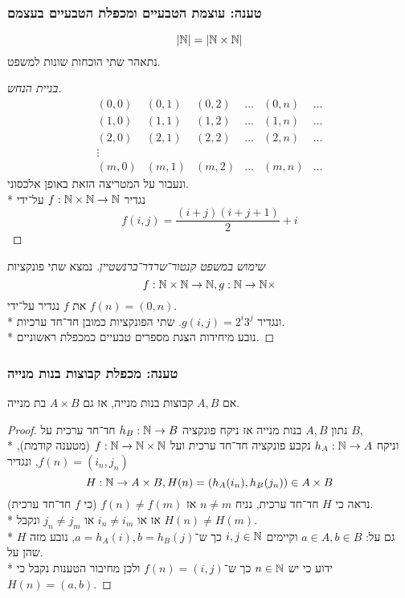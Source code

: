 \subsubsection{טענה: עוצמת הטבעיים ומכפלת הטבעיים בעצמם}
\[
	|\mathbb{N}| = |\mathbb{N} \times \mathbb{N}|
\]
נתאהר שתי הוכחות שונות למשפט.
\begin{proof}[בניית הנחש]
	\[
		\begin{matrix}
			(0, 0) & (0, 1) & (0, 2) & \hdots & (0, n) & \hdots \\
			(1, 0) & (1, 1) & (1, 2) & \hdots & (1, n) & \hdots \\
			(2, 0) & (2, 1) & (2, 2) & \hdots & (2, n) & \hdots \\
			\vdots \\
			(m, 0) & (m, 1) & (m, 2) & \hdots & (m, n) & \hdots
		\end{matrix}
	\]
	ונעבור על המטריצה הזאת באופן אלכסוני. \\*
	נגדיר $f : \mathbb{N} \times \mathbb{N} \to \mathbb{N}$ על־ידי
	\[
		f(i, j) = \frac{(i + j)(i + j + 1)}{2} + i
	\]
\end{proof}
\begin{proof}[שימוש במשפט קנטור־שרדר־ברנשטיין]
	נמצא שתי פונקציות
	\[
		f : \mathbb{N} \times \mathbb{N} \to \mathbb{N},
		g : \mathbb{N} \to \mathbb{N} \times
	\]
	את $f$ נגדיר על־ידי $f(n) = (0, n)$. \\*
	ונגדיר $g(i, j) = 2^i 3^j$. שתי הפונקציות כמובן חד־חד ערכיות. \\*
	נובע מיחידות הצגת מספרים טבעיים כמכפלת ראשוניים.
\end{proof}

\subsubsection{טענה: מכפלת קבוצות בנות מנייה}
אם $A, B$ קבוצות בנות מנייה, אז גם $A \times B$ בת מנייה.
\begin{proof}
	נתון $A, B$ בנות מנייה אז ניקח פונקציה $h_B : \mathbb{N} \to B$ חד־חד ערכית על $B$, \\*
	וניקח $h_A : \mathbb{N} \to A$
	נקבע פונקציה חד־חד ערכית ועל $f : \mathbb{N} \to \mathbb{N} \times \mathbb{N}$ (מטענה קודמת), $f(n) = (i_n, j_n)$, ונגדיר
	\[
		H : \mathbb{N} \to A \times B, H(n) = (h_A(i_n), h_B(j_n)) \in A \times B
	\]
	נראה כי $H$ חד־חד ערכית, נניח $n \ne m$ אז $f(n) \ne f(m)$ (כי $f$ חד־חד ערכית). \\*
	אז או $i_n \ne i_m$ או $j_n \ne j_m$ ונקבל $H(n) \ne H(m)$. \\*
	$H$ גם על: $a \in A, b \in B$ וקיימים $i, j \in \mathbb{N}$ כך ש־$a = h_A(i), b = h_B(j)$, נובע מזה שהן על. \\*
	ידוע כי יש $n \in \mathbb{N}$ כך ש־$f(n) = (i, j)$ ולכן מחיבור הטענות נקבל כי $H(n) = (a, b)$.
\end{proof}

